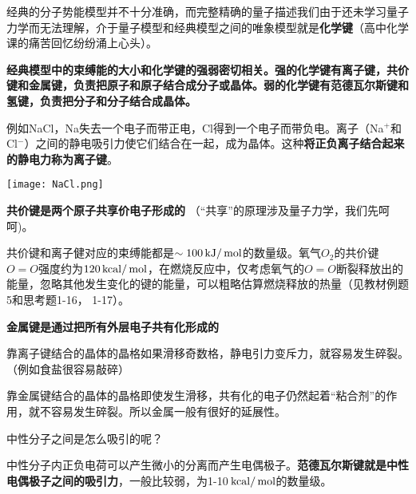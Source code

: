 \documentclass[CJK]{beamer}
\begin{document}
\begin{frame}
\bch
经典的分子势能模型并不十分准确，而完整精确的量子描述我们由于还未学习量子力学而无法理解，介于量子模型和经典模型之间的唯象模型就是{\bf 化学键}（高中化学课的痛苦回忆纷纷涌上心头\wulian）。

\skipline

{\bf 经典模型中的束缚能的大小和化学键的强弱密切相关。强的化学键有离子键，共价键和金属键，负责把原子和原子结合成分子或晶体。弱的化学键有范德瓦尔斯键和氢键，负责把分子和分子结合成晶体。}
\ech
\end{frame}

\begin{frame}
\bch

例如NaCl，Na失去一个电子而带正电，Cl得到一个电子而带负电。离子（Na$^+$和Cl$^{-}$）之间的静电吸引力使它们结合在一起，成为晶体。这种{\bf 将正负离子结合起来的静电力称为离子键}。

\skipline

\bcenter
\texttt{[image: NaCl.png]}
\ecenter

\ech
\end{frame}

\begin{frame}
\bch

{\bf 共价键是两个原子共享价电子形成的} （“共享”的原理涉及量子力学，我们先呵呵\bye)。

\skiplines

共价键和离子健对应的束缚能都是$\sim 100 \,\mathrm{kJ}/\,\mathrm{mol}$的数量级。氧气$O_2$的共价键$O=O$强度约为$120 \,\mathrm{kcal}/\,\mathrm{mol}$，在燃烧反应中，仅考虑氧气的$O=O$断裂释放出的能量，忽略其他发生变化的键的能量，可以粗略估算燃烧释放的热量（见教材例题5和思考题1-16， 1-17）。
\ech
\end{frame}

\begin{frame}
\bch

{\bf 金属键是通过把所有外层电子共有化形成的}

\skipline

靠离子键结合的晶体的晶格如果滑移奇数格，静电引力变斥力，就容易发生碎裂。（例如食盐很容易敲碎）

\skipline

靠金属键结合的晶体的晶格即使发生滑移，共有化的电子仍然起着“粘合剂”的作用，就不容易发生碎裂。所以金属一般有很好的延展性。

\ech
\end{frame}

\begin{frame}
\bch

中性分子之间是怎么吸引的呢？

\skipline

中性分子内正负电荷可以产生微小的分离而产生电偶极子。{\bf 范德瓦尔斯键就是中性电偶极子之间的吸引力}，一般比较弱，为1-10$\,\mathrm{kcal}/\,\mathrm{mol}$的数量级。
\ech
\end{frame}
\end{document}
